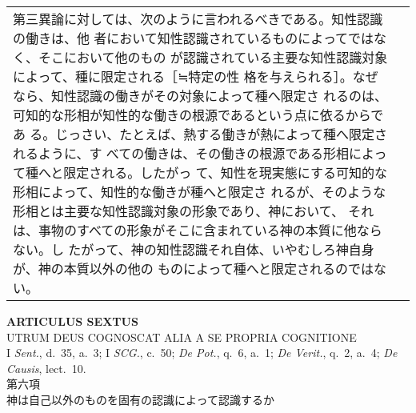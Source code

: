 \documentclass[10pt]{jsarticle} %
\begin{document}
\begin{longtable}{p{21em}p{21em}}
第三異論に対しては、次のように言われるべきである。知性認識の働きは、他
者において知性認識されているものによってではなく、そこにおいて他のもの
が認識されている主要な知性認識対象によって、種に限定される［≒特定の性
格を与えられる］。なぜなら、知性認識の働きがその対象によって種へ限定さ
れるのは、可知的な形相が知性的な働きの根源であるという点に依るからであ
る。じっさい、たとえば、熱する働きが熱によって種へ限定されるように、す
べての働きは、その働きの根源である形相によって種へと限定される。したがっ
て、知性を現実態にする可知的な形相によって、知性的な働きが種へと限定さ
れるが、そのような形相とは主要な知性認識対象の形象であり、神において、
それは、事物のすべての形象がそこに含まれている神の本質に他ならない。し
たがって、神の知性認識それ自体、いやむしろ神自身が、神の本質以外の他の
ものによって種へと限定されるのではない。


\end{longtable}
\newpage


\begin{center}
 {\Large {\bf ARTICULUS SEXTUS}}\\
 {\large UTRUM DEUS COGNOSCAT ALIA A SE PROPRIA COGNITIONE}\\
 {\footnotesize I {\itshape Sent.}, d.~35, a.~3; I {\itshape SCG.},
 c.~50; {\itshape De Pot.}, q.~6, a.~1; {\itshape De Verit.}, q.~2,
 a.~4; {\itshape De Causis}, lect.~10.}\\
 {\Large 第六項\\神は自己以外のものを固有の認識によって認識するか}
\end{center}
\end{document}
